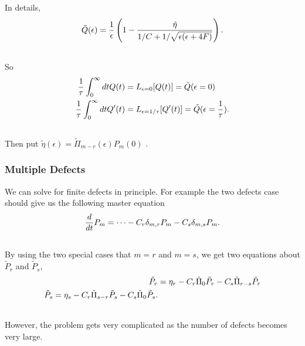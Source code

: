 \documentclass[letterpaper,10pt,english]{sphinxmanual}
\begin{document}
In details,
\begin{gather}
\begin{split}\tilde Q(\epsilon) = \frac{1}{\epsilon} \left( 1- \frac{\tilde \eta}{1/C + 1/\sqrt{\epsilon(\epsilon +4F)}} \right).\end{split}\notag\\\begin{split}\end{split}\notag
\end{gather}
So
\begin{gather}
\begin{split}\frac{1}{\tau}\int_0^\infty dt Q(t)  &= L_{\epsilon=0}[Q(t)] = \tilde Q(\epsilon=0) \\
\frac{1}{\tau}\int_0^\infty dt Q'(t)  &= L_{\epsilon=1/\tau}[Q'(t)] = \tilde Q(\epsilon=\frac{1}{\tau}).\end{split}\notag\\\begin{split}\end{split}\notag
\end{gather}
Then put $\tilde \eta (\epsilon) = \tilde \Pi_{m-r}(\epsilon) P_m(0)$ .


\subsubsection{Multiple Defects}
\label{nonequilibrium/effectOfDefects:multiple-defects}
We can solve for finite defects in principle. For example the two defects case should give us the following master equation
\begin{gather}
\begin{split}\frac{d}{dt}P_m = \cdots - C_r\delta_{m,r}P_m  - C_s \delta_{m,s} P_m.\end{split}\notag\\\begin{split}\end{split}\notag
\end{gather}
By using the two special cases that $m=r$ and $m=s$, we get two equations about $\tilde P_r$ and $\tilde P_s$,
\begin{gather}
\begin{split}\tilde P_r &= \eta_r - C_r \tilde \Pi_0 \tilde P_r - C_s \tilde \Pi_{r-s} \tilde P_r \\
\tilde P_s = \eta_s - C_r \tilde \Pi_{s-r} \tilde P_s - C_s \tilde \Pi_0 \tilde P_s.\end{split}\notag\\\begin{split}\end{split}\notag
\end{gather}
However, the problem gets very complicated as the number of defects becomes very large.
\end{document}
